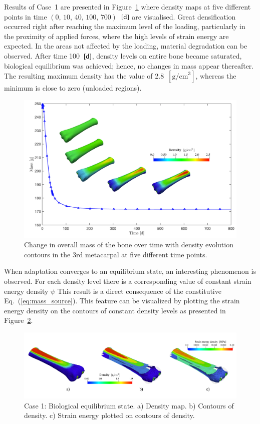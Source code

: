\documentclass[11pt]{acmeArticle}
\numberwithin{equation}{section}
\begin{document}
Results of Case~1 are presented in Figure~\ref{fig:mc3_density} where density maps at five different points in time $(\text{0, 10, 40, 100, 700})$~$[\text d]$ are visualised. 
Great densification occurred right after reaching the maximum level of the loading, particularly in the proximity of applied forces, where the high levels of strain energy are expected. 
In the areas not affected by the loading, material degradation can be observed. 
After time 100~$[{\text d}]$, density levels on entire bone became saturated, biological equilibrium was achieved; hence, no changes in mass appear thereafter. 
The resulting maximum density has the value of 2.8~$[{\text {g/cm}}^3]$, whereas the minimum is close to zero (unloaded regions).
\begin{figure}[h!]
	\begin{centering}
		\includegraphics[width=15cm]{Figures/graphs/mc3_density.png}
		\caption{Change in overall mass of the bone over time with density evolution contours in the 3rd metacarpal at five different time points.}
		\label{fig:mc3_density}
	\end{centering}
\end{figure}
When adaptation converges to an equilibrium state, an interesting phenomenon is observed.
For each density level there is a corresponding value of constant strain energy density $\psi$
This result is a direct consequence of the constitutive Eq.~(\ref{eq:mass_source}).
This feature can be visualized by plotting the strain energy density on the contours of constant density levels as presented in Figure~\ref{fig:mc3_biol_eq}. 
\begin{figure}[h!]
	\begin{centering}
		\includegraphics[width=15cm]{Figures/mc3_biol_eq.png}
		\caption{Case 1: Biological equilibrium state. a) Density map. b) Contours of density. c) Strain energy plotted on contours of density.}
		\label{fig:mc3_biol_eq}
	\end{centering}
\end{figure}
\end{document}
